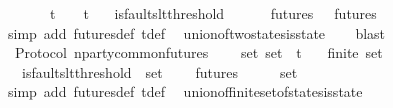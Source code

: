 \begin{isabellebody}
\ \ {\isachardoublequoteopen}{\isasymforall}\ {\isasymsigma}{}\ {\isasymsigma}{}{\isachardot}\ {\isasymsigma}{}\ {\isasymin}\ {\isasymSigma}t\ {\isasymand}\ {\isasymsigma}{}\ {\isasymin}\ {\isasymSigma}t\isanewline
\ \ {\isasymlongrightarrow}\ is{\isacharunderscore}faults{\isacharunderscore}lt{\isacharunderscore}threshold\ {\isacharparenleft}{\isasymsigma}{}\ {\isasymunion}\ {\isasymsigma}{}{\isacharparenright}\isanewline
\ \ {\isasymlongrightarrow}\ futures\ {\isasymsigma}{}\ {\isasyminter}\ futures\ {\isasymsigma}{}\ {\isasymnoteq}\ {\isasymemptyset}{\isachardoublequoteclose}\isanewline
%
\isadelimproof
\ \ %
\endisadelimproof
%
\isatagproof
{}\isamarkupfalse%
\ {\isacharparenleft}simp\ add{\isacharcolon}\ futures{\isacharunderscore}def\ {\isasymSigma}t{\isacharunderscore}def{\isacharparenright}\ \isamarkupfalse%
\ union{\isacharunderscore}of{\isacharunderscore}two{\isacharunderscore}states{\isacharunderscore}is{\isacharunderscore}state\isanewline
\ \ \isamarkupfalse%
\ blast%
\endisatagproof
{\isafoldproof}%
%
\isadelimproof
\isanewline
%
\endisadelimproof
\isanewline
\isanewline
{}\isamarkupfalse%
\ {\isacharparenleft}\ Protocol{\isacharparenright}\ n{\isacharunderscore}party{\isacharunderscore}common{\isacharunderscore}futures\ {\isacharcolon}\isanewline
\ \ {\isachardoublequoteopen}{\isasymforall}\ {\isasymsigma}{\isacharunderscore}set{\isachardot}\ {\isasymsigma}{\isacharunderscore}set\ {\isasymsubseteq}\ {\isasymSigma}t\isanewline
\ \ {\isasymlongrightarrow}\ finite\ {\isasymsigma}{\isacharunderscore}set\isanewline
\ \ {\isasymlongrightarrow}\ is{\isacharunderscore}faults{\isacharunderscore}lt{\isacharunderscore}threshold\ {\isacharparenleft}{\isasymUnion}\ {\isasymsigma}{\isacharunderscore}set{\isacharparenright}\isanewline
\ \ {\isasymlongrightarrow}\ {\isasymInter}\ {\isacharbraceleft}futures\ {\isasymsigma}\ {\isacharbar}\ {\isasymsigma}{\isachardot}\ {\isasymsigma}\ {\isasymin}\ {\isasymsigma}{\isacharunderscore}set{\isacharbraceright}\ {\isasymnoteq}\ {\isasymemptyset}{\isachardoublequoteclose}\isanewline
%
\isadelimproof
\ \ %
\endisadelimproof
%
\isatagproof
{}\isamarkupfalse%
\ {\isacharparenleft}simp\ add{\isacharcolon}\ futures{\isacharunderscore}def\ {\isasymSigma}t{\isacharunderscore}def{\isacharparenright}\ \isamarkupfalse%
\ union{\isacharunderscore}of{\isacharunderscore}finite{\isacharunderscore}set{\isacharunderscore}of{\isacharunderscore}states{\isacharunderscore}is{\isacharunderscore}state\isanewline

\end{isabellebody}
